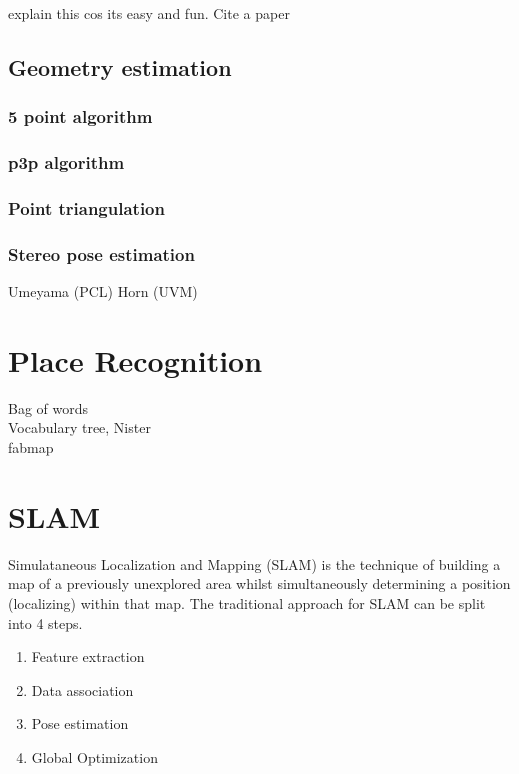 explain this cos its easy and fun.  Cite a paper

\subsection{Geometry estimation}

\subsubsection{5 point algorithm}
\label{subsec:5point}

\subsubsection{p3p algorithm}
\label{subsec:p3p}

\subsubsection{Point triangulation}
\label{subsec:point_triangulation}


\subsubsection{Stereo pose estimation}
\label{subsec:horn}

Umeyama (PCL) \newline 
Horn (UVM) \newline

\section{Place Recognition}
\label{sec:bag_of_words}
Bag of words \\
Vocabulary tree, Nister \\
fabmap

\section{SLAM}
\label{sec:slam}

Simulataneous Localization and Mapping (SLAM) is the technique of building a map of a previously
unexplored area whilst simultaneously determining a position (localizing) within that map.  The
traditional approach for SLAM can be split into 4 steps.
\begin{enumerate} \itemsep1pt \parskip0pt 
 \item Feature extraction
 \item Data association
 \item Pose estimation
 \item Global Optimization
\end{enumerate}

